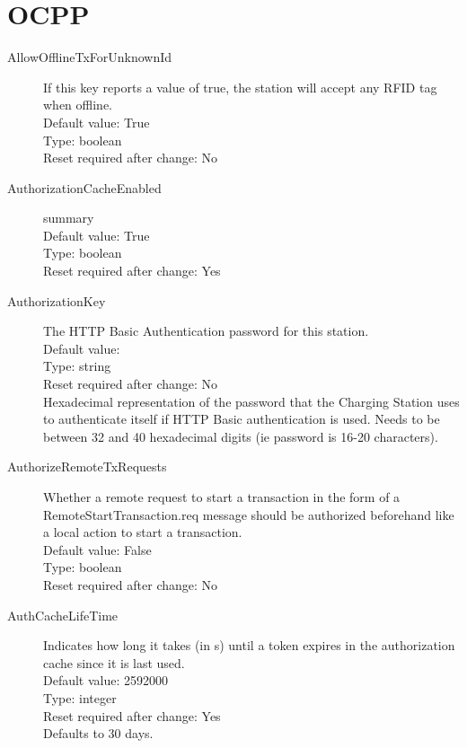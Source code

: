 \pagebreak\section{OCPP}

\begin{description}
\item[AllowOfflineTxForUnknownId] If this key reports a value of true, the station will accept any RFID tag when offline.\\
  Default value: True\\
  Type: boolean\\
  Reset required after change: No\\

\item[AuthorizationCacheEnabled] summary\\
  Default value: True\\
  Type: boolean\\
  Reset required after change: Yes\\

\item[AuthorizationKey] The HTTP Basic Authentication password for this station.\\
  Default value: \\
  Type: string\\
  Reset required after change: No\\
  Hexadecimal representation of the password that the Charging Station uses to authenticate itself if HTTP Basic authentication is used. Needs to be between 32 and 40 hexadecimal digits (ie password is 16-20 characters).\\

\item[AuthorizeRemoteTxRequests] Whether a remote request to start a transaction in the form of a RemoteStartTransaction.req message should be authorized beforehand like a local action to start a transaction.\\
  Default value: False\\
  Type: boolean\\
  Reset required after change: No\\

\item[AuthCacheLifeTime] Indicates how long it takes (in s) until a token expires in the authorization cache since it is last used.\\
  Default value: 2592000\\
  Type: integer\\
  Reset required after change: Yes\\
  Defaults to 30 days.\\


\end{description}
